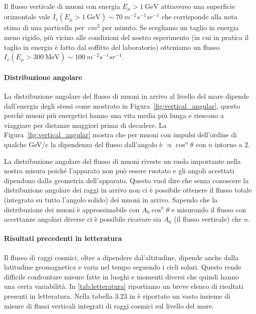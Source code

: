Il flusso verticale di muoni con energia $E_{\mu} > \SI{1}{\GeV}$ attraverso una superficie orizzontale vale $I_v(E_{\mu} > \SI{1}{\GeV}) \sim \SI{70}{m^{-2} s^{-1} sr^{-1}}$ che corrisponde alla nota stima di una particella per $\SI{}{cm^2}$ per minuto. Se scegliamo un taglio in energia meno rigido, più vicino alle condizioni del nostro esperimento (in cui in pratica il taglio in energia è fatto dal soffitto del laboratorio) otteniamo un flusso $I_v(E_{\mu} > \SI{300}{\MeV}) \sim \SI{100}{m^{-2} s^{-1} sr^{-1}}$.

\paragraph{Distribuzione angolare}

La distribuzione angolare del flusso di muoni in arrivo al livello del mare dipende dall'energia degli stessi come mostrato in Figura~\ref{fig:vertical_angular}, questo perché muoni più energetici hanno una vita media più lunga e riescono a viaggiare per distanze maggiori prima di decadere.
La Figura~\ref{fig:vertical_angular} mostra che per muoni con impulsi dell'ordine di qualche GeV/c la dipendenza del flusso dall'angolo è $\propto \cos^n\theta$ con $n$ intorno a 2.

La distribuzione angolare del flusso di muoni riveste un ruolo importante nella nostra misura poiché l'apparato non può essere ruotato e gli angoli accettati dipendono dalla geometria dell'apparato. Questo vuol dire che senza conoscere la distribuzione angolare dei raggi in arrivo non ci è possibile ottenere il flusso totale (integrato su tutto l'angolo solido) dei muoni in arrivo. Sapendo che la distribuzione dei muoni è approssimabile con $A_0 \cos^n\theta$ e misurando il flusso con accettanze angolari diverse ci è possibile ricavare sia $A_0$ (il flusso verticale) che $n$.

\paragraph{Risultati precedenti in letteratura}

Il flusso di raggi cosmici, oltre a dipendere dal'altitudine, dipende anche dalla latitudine geomagnetica e varia nel tempo seguendo i cicli solari. Questo rende difficile confrontare misure fatte in luoghi e momenti diversi che quindi hanno una certa variabilità.
In \autoref{tab:letteratura} riportiamo un breve elenco di risultati presenti in letteratura. Nella tabella 3.23 in \cite{12}  è riportato un vasto insieme di misure di flussi verticali integrati di raggi cosmici sul livello del mare.


